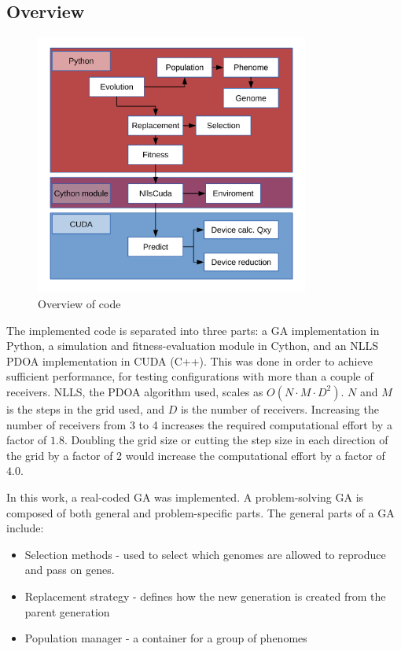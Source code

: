 \documentclass[10pt,a4paper]{book}
\begin{document}
\subsection{Overview}

\begin{figure}[htp]
\centering
\includegraphics[width=90mm]{Codeoverview.pdf}
\caption{Overview of code}
\label{overviewofcode}
\end{figure}

The implemented code is separated into three parts: a \gls{GA} implementation in Python, a simulation and fitness-evaluation module in Cython, and an \gls{NLLS} \gls{PDOA} implementation in \gls{CUDA} (C++). This was done in order to achieve sufficient performance, for testing configurations with more than a couple of receivers. \gls{NLLS}, the \gls{PDOA} algorithm used, scales as $O(N \cdot M \cdot D^2)$. $N$ and $M$ is the steps in the grid used, and $D$ is the number of receivers. Increasing the number of receivers from 3 to 4 increases the required computational effort by a factor of $1.8$. Doubling the grid size or cutting the step size in each direction of the grid by a factor of 2 would increase the computational effort by a factor of $4.0$. 

\newpage 
In this work, a real-coded \gls{GA} was implemented. A problem-solving \gls{GA} is composed of both general and problem-specific parts. The general parts of a \gls{GA} include:

\begin{itemize}
\item Selection methods - used to select which genomes are allowed to reproduce and pass on genes.
\item Replacement strategy - defines how the new generation is created from the parent generation
\item Population manager - a container for a group of phenomes
\end{itemize}
\end{document}
